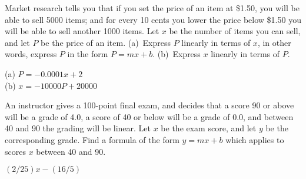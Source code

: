 \begin{enumialphparenastyle}
\begin{multicols}{2}
\begin{ex}
Market research tells you that if you set the price of an item at
\$1.50, you will be able to sell 5000 items; and for every 10 cents you
lower the price below \$1.50 you will be able to sell another 1000 items.
Let $x$ be the number of items you can sell, and let $P$ be the price of
an item.  (a)~Express $P$ linearly in terms of $x$, in other words,
express $P$ in the form $P=mx+b$.  (b)~Express $x$
linearly in terms of $P$.
\begin{sol}
(a) $P=-0.0001x+2$\\
(b) $x=-10000P+20000$
\end{sol}
\end{ex}

\begin{ex}
An instructor gives a 100-point final exam, and decides that a score
90 or above will be a grade of 4.0, a score of 40 or below will be a grade
of 0.0, and between 40 and 90 the grading will be linear.  Let $x$ be
the exam score, and let $y$ be the corresponding grade.  Find a formula
of the form $y=mx+b$ which applies to scores $x$ between 40 and 90.
\begin{sol}
$(2/25)x-(16/5)$
\end{sol}
\end{ex}

%


\end{multicols}
\end{enumialphparenastyle}
